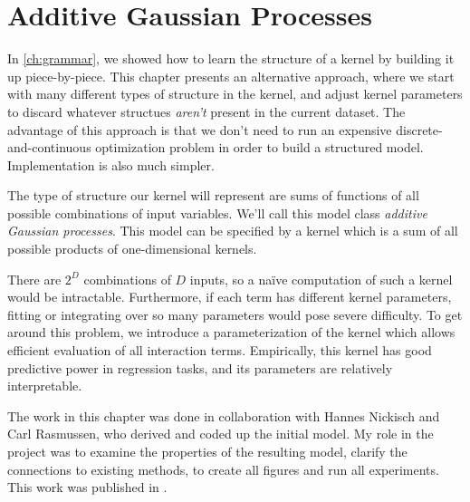 
\inbpdocument



\chapter{Additive Gaussian Processes}
\label{ch:additive}


In \cref{ch:grammar}, we showed how to learn the structure of a kernel by building it up piece-by-piece.
This chapter presents an alternative approach, where we start with many different types of structure in the kernel, and adjust kernel parameters to discard whatever structues \emph{aren't} present in the current dataset.
The advantage of this approach is that we don't need to run an expensive discrete-and-continuous optimization problem in order to build a structured model.
Implementation is also much simpler.

The type of structure our kernel will represent are sums of functions of all possible combinations of input variables.
We'll call this model class \emph{additive Gaussian processes}.
This model can be specified by a kernel which is a sum of all possible products of one-dimensional kernels.

There are $2^D$ combinations of $D$ inputs, so a na\"{i}ve computation of such a kernel would be intractable.
Furthermore, if each term has different kernel parameters, fitting or integrating over so many parameters would pose severe difficulty.
To get around this problem, we introduce a parameterization of the kernel which allows efficient evaluation of all interaction terms.
Empirically, this kernel has good predictive power in regression tasks, and its parameters are relatively interpretable.

The work in this chapter was done in collaboration with Hannes Nickisch and Carl Rasmussen, who derived and coded up the initial model.
My role in the project was to examine the properties of the resulting model, clarify the connections to existing methods, to create all figures and run all experiments.
This work was published in \citep{duvenaud2011additive11}.





